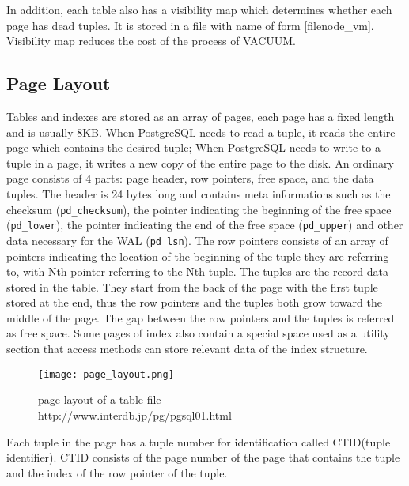 \documentclass[a4paper]{article}
\begin{document}
In addition, each table also has a visibility map which determines whether each page has dead tuples. It is stored in a file with name of form [filenode\_vm]. Visibility map reduces the cost of the process of VACUUM\cite{20}.

\subsection{Page Layout}
Tables and indexes are stored as an array of pages, each page has a fixed length and is usually 8KB. When PostgreSQL needs to read a tuple, it reads the entire page which contains the desired tuple; When PostgreSQL needs to write to a tuple in a page, it writes a new copy of the entire page to the disk\cite{1}. An ordinary page consists of 4 parts: page header, row pointers, free space, and the data tuples. The header is 24 bytes long and contains meta informations such as the checksum (\texttt{pd\_checksum}), the pointer indicating the beginning of the free space (\texttt{pd\_lower}), the pointer indicating the end of the free space (\texttt{pd\_upper}) and other data necessary for the WAL (\texttt{pd\_lsn}). The row pointers consists of an array of pointers indicating the location of the beginning of the tuple they are referring to, with Nth pointer referring to the Nth tuple. The tuples are the record data stored in the table. They start from the back of the page with the first tuple stored at the end, thus the row pointers and the tuples both grow toward the middle of the page. The gap between the row pointers and the tuples is referred as free space. Some pages of index also contain a special space used as a utility section that access methods can store relevant data of the index structure\cite{1}.

\begin{figure}[H]
\centering
\texttt{[image: page\_layout.png]}
\caption{page layout of a table file\\http://www.interdb.jp/pg/pgsql01.html }
\end{figure}

Each tuple in the page has a tuple number for identification called CTID(tuple identifier). CTID consists of the page number of the page that contains the tuple and the index of the row pointer of the tuple\cite{1}. 
\end{document}
